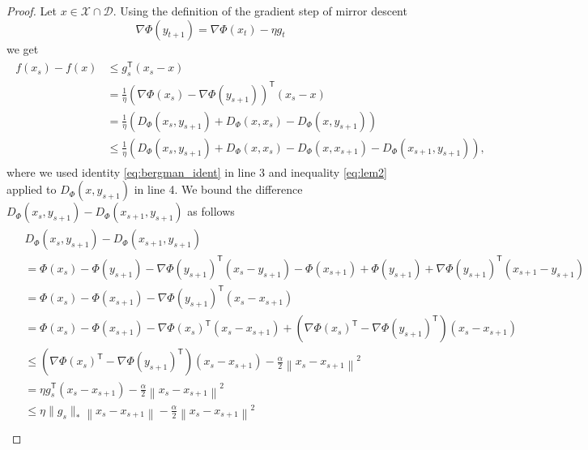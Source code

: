 \begin{proof}
Let $x\in \mathcal{X}\cap\mathcal{D}$. Using the definition of the gradient step of mirror descent
\begin{equation*}
	\nabla\Phi(y_{t+1}) = \nabla\Phi(x_t)-\eta g_t
\end{equation*}
we get
\begin{align}\label{first_part_mirror_descent_lemma}
    \begin{aligned}
        f(x_s) - f(x) &\leq g_s^\mathsf{T}\left(x_s - x\right) \\
        & = \frac{1}{\eta}\left(\nabla\Phi(x_s) - \nabla\Phi(y_{s+1}) \right)^\mathsf{T}\left(x_s - x\right) \\
        & = \frac{1}{\eta}\left(D_\Phi(x_s, y_{s+1}) + D_\Phi(x, x_s) - D_\Phi(x, y_{s+1}) \right)	\\
        & \leq  \frac{1}{\eta}\left(D_\Phi(x_s, y_{s+1}) + D_\Phi(x, x_s) - D_\Phi(x, x_{s+1}) - D_\Phi(x_{s+1}, y_{s+1})\right),
    \end{aligned}
\end{align}
where we used identity \eqref{eq:bergman_ident} in line 3 and inequality \eqref{eq:lem2} applied to $D_\Phi(x, y_{s+1})$ in line 4. We bound the difference $D_\Phi(x_s, y_{s+1}) - D_\Phi(x_{s+1}, y_{s+1})$ as follows
\begin{align}\label{key_inequality_mirror_descent}
    \begin{aligned}
	& D_\Phi(x_s, y_{s+1}) - D_\Phi(x_{s+1}, y_{s+1}) 	\\
	& = \Phi(x_s) - \Phi(y_{s+1}) - \nabla \Phi(y_{s+1})^\mathsf{T}(x_s - y_{s+1}) - \Phi(x_{s+1}) + \Phi(y_{s+1}) + \nabla \Phi(y_{s+1})^\mathsf{T}(x_{s+1} - y_{s+1}) \\
	& = \Phi(x_s) - \Phi(x_{s+1}) - \nabla\Phi(y_{s+1})^\mathsf{T}\left(x_s - x_{s+1}\right) \\
	& = \Phi(x_s) - \Phi(x_{s+1}) - \nabla\Phi(x_s)^\mathsf{T}\left(x_s - x_{s+1}\right) + \left(\nabla\Phi(x_s)^\mathsf{T} - \nabla\Phi(y_{s+1})^\mathsf{T}\right)\left(x_s - x_{s+1}\right) \\
	& \leq \left(\nabla\Phi(x_s)^\mathsf{T} - \nabla\Phi(y_{s+1})^\mathsf{T}\right)\left(x_s - x_{s+1}\right) - \frac{\alpha}{2}\left\|x_s - x_{s+1} \right\|^2 \\
	& = \eta g_s^\mathsf{T}\left(x_s - x_{s+1}\right) - \frac{\alpha}{2}\left\|x_s - x_{s+1} \right\|^2 \\
	& \leq \eta \|g_s\|_\ast\left\|x_s - x_{s+1}\right\| -\frac{\alpha}{2}\left\|x_s - x_{s+1}\right\|^2 \\

\end{aligned}
\end{align}
\end{proof}
